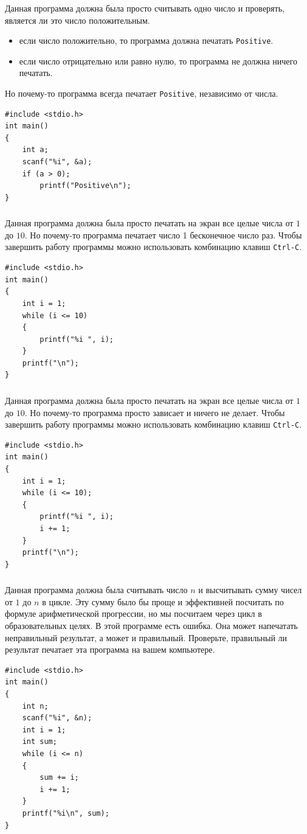 \documentclass[10pt]{article}
\begin{document}
\subsubsection{}
Данная программа должна была просто считывать одно число и проверять, является ли это число положительным.
\begin{itemize}
\item если число положительно, то программа должна печатать \texttt{Positive}.
\item если число отрицательно или равно нулю, то программа не должна ничего печатать.
\end{itemize}
Но почему-то программа всегда печатает \texttt{Positive}, независимо от числа.
\begin{lstlisting}
#include <stdio.h>
int main()
{
    int a;
    scanf("%i", &a);
    if (a > 0);
        printf("Positive\n");
}
\end{lstlisting}


\subsubsection{}
Данная программа должна была просто печатать на экран все целые числа от $1$ до $10$.
Но почему-то программа печатает число 1 бесконечное число раз.
Чтобы завершить работу программы можно использовать комбинацию клавиш  \texttt{Ctrl-C}.
\begin{lstlisting}
#include <stdio.h>
int main()
{
    int i = 1;
    while (i <= 10)
    {
        printf("%i ", i);
    }
    printf("\n");
}
\end{lstlisting}



\subsubsection{}
Данная программа должна была просто печатать на экран все целые числа от $1$ до $10$.
Но почему-то программа просто зависает и ничего не делает.
Чтобы завершить работу программы можно использовать комбинацию клавиш  \texttt{Ctrl-C}.
\begin{lstlisting}
#include <stdio.h>
int main()
{
    int i = 1;
    while (i <= 10);
    {
        printf("%i ", i);
        i += 1;
    }
    printf("\n");
}
\end{lstlisting}


\subsubsection{}
Данная программа должна была считывать число $n$ и высчитывать сумму чисел от $1$ до $n$ в цикле.
Эту сумму было бы проще и эффективней посчитать по формуле арифметической прогрессии, 
но мы посчитаем через цикл в образовательных целях.
В этой программе есть ошибка. Она может напечатать неправильный результат, а может и правильный.
Проверьте, правильный ли результат печатает эта программа на вашем компьютере.
\begin{lstlisting}
#include <stdio.h>
int main()
{
    int n;
    scanf("%i", &n);
    int i = 1;
    int sum;
    while (i <= n)
    {
        sum += i;
        i += 1;
    }
    printf("%i\n", sum);
}
\end{lstlisting}
\end{document}
